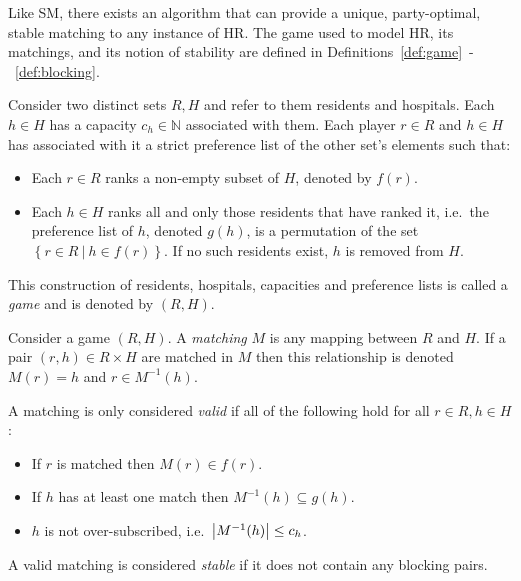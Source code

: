 Like SM, there exists an algorithm that can provide a unique, party-optimal,
stable matching to any instance of HR. The game used to model HR, its matchings,
and its notion of stability are defined in
Definitions~\ref{def:game}~\--~\ref{def:blocking}.

\begin{definition}\label{def:game}
    Consider two distinct sets \(R, H\) and refer to them residents and
    hospitals. Each \(h \in H\) has a capacity \(c_h \in \mathbb{N}\) associated
    with them. Each player \(r \in R\) and \(h \in H\) has associated 
    with it a strict preference list of the other set's elements such that:
    \begin{itemize}
        \item Each \(r \in R\) ranks a non-empty subset of \(H\), denoted by
            \(f(r)\).
        \item Each \(h \in H\) ranks all and only those residents that have
            ranked it, i.e.\ the preference list of \(h\), denoted \(g(h)\), is
            a permutation of the set
            \(\left\{r \in R \ | \ h \in f(r)\right\}\). If no such residents
            exist, \(h\) is removed from \(H\).
    \end{itemize}

    This construction of residents, hospitals, capacities and preference lists
    is called a \emph{game} and is denoted by \((R, H)\).
\end{definition}

\begin{definition}\label{def:matching}
    Consider a game \((R, H)\). A \emph{matching} \(M\) is any mapping between
    \(R\) and \(H\). If a pair \((r, h) \in R \times H\) are matched in \(M\)
    then this relationship is denoted \(M(r) = h\) and \(r \in M^{-1}(h)\).

    A matching is only considered \emph{valid} if all of the following hold for
    all \(r \in R, h \in H\):
    \begin{itemize}
        \item If \(r\) is matched then \(M(r) \in f(r)\).
        \item If \(h\) has at least one match then \(M^{-1}(h) \subseteq g(h)\).
        \item \(h\) is not over-subscribed, i.e.\ \(\abs*{M^{-1}(h)} \leq c_h\).
    \end{itemize}

    A valid matching is considered \emph{stable} if it does not contain any
    blocking pairs.
\end{definition}


